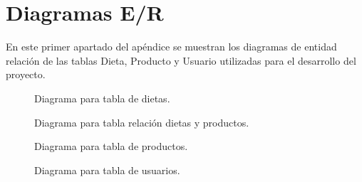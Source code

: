 \chapter{Diagramas E/R} \label{apendiceB}

En este primer apartado del apéndice se muestran los diagramas de entidad relación de las tablas Dieta, Producto y Usuario utilizadas 
para el desarrollo del proyecto.

\begin{figure}[H]
	\centering
	\noindent{}
	\caption{Diagrama para tabla de dietas.}
\end{figure}

\begin{figure}[H]
	\centering
	\noindent{}
	\caption{Diagrama para tabla relación dietas y productos.}
\end{figure}

\begin{figure}[H]
	\centering
	\noindent{}
	\caption{Diagrama para tabla de productos.}
\end{figure}

\begin{figure}[H]
	\centering
	\noindent{}
	\caption{Diagrama para tabla de usuarios.}
\end{figure}